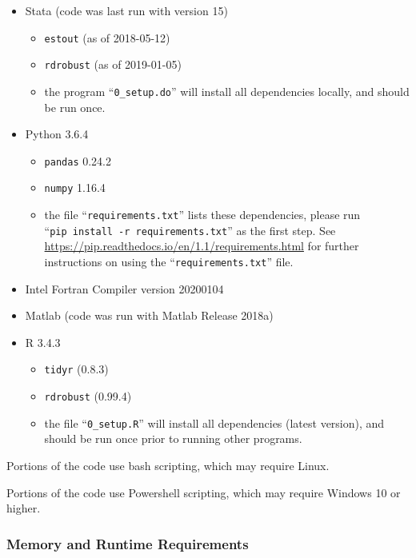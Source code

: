 \documentclass[
]{article}
\providecommand{\tightlist}{%
  \setlength{\itemsep}{0pt}\setlength{\parskip}{0pt}}
\begin{document}
\begin{itemize}
\tightlist
\item
  Stata (code was last run with version 15)

  \begin{itemize}
  \tightlist
  \item
    \texttt{estout} (as of 2018-05-12)
  \item
    \texttt{rdrobust} (as of 2019-01-05)
  \item
    the program ``\texttt{0\_setup.do}'' will install all dependencies
    locally, and should be run once.
  \end{itemize}
\item
  Python 3.6.4

  \begin{itemize}
  \tightlist
  \item
    \texttt{pandas} 0.24.2
  \item
    \texttt{numpy} 1.16.4
  \item
    the file ``\texttt{requirements.txt}'' lists these dependencies,
    please run ``\texttt{pip\ install\ -r\ requirements.txt}'' as the
    first step. See
    \url{https://pip.readthedocs.io/en/1.1/requirements.html} for
    further instructions on using the ``\texttt{requirements.txt}''
    file.
  \end{itemize}
\item
  Intel Fortran Compiler version 20200104
\item
  Matlab (code was run with Matlab Release 2018a)
\item
  R 3.4.3

  \begin{itemize}
  \tightlist
  \item
    \texttt{tidyr} (0.8.3)
  \item
    \texttt{rdrobust} (0.99.4)
  \item
    the file ``\texttt{0\_setup.R}'' will install all dependencies
    (latest version), and should be run once prior to running other
    programs.
  \end{itemize}
\end{itemize}

Portions of the code use bash scripting, which may require Linux.

Portions of the code use Powershell scripting, which may require Windows
10 or higher.

\hypertarget{memory-and-runtime-requirements}{%
\subsubsection{Memory and Runtime
Requirements}\label{memory-and-runtime-requirements}}
\end{document}
